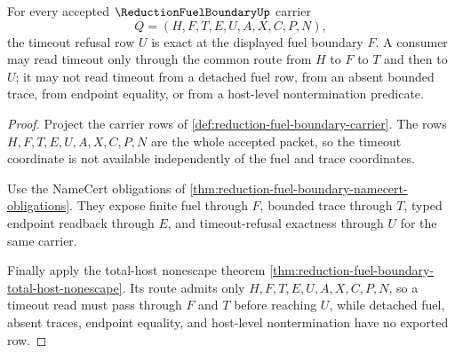 \begin{theorem}
\label{thm:reduction-fuel-boundary-fuel-timeout-exactness}
For every accepted $\ReductionFuelBoundaryUp$ carrier
$$
Q=(H,F,T,E,U,A,X,C,P,N),
$$
the timeout refusal row $U$ is exact at the displayed fuel boundary $F$. A consumer may read timeout only through the common route from $H$ to $F$ to $T$ and then to $U$; it may not read timeout from a detached fuel row, from an absent bounded trace, from endpoint equality, or from a host-level nontermination predicate.
\end{theorem}
\begin{proof}
Project the carrier rows of \autoref{def:reduction-fuel-boundary-carrier}. The rows $H,F,T,E,U,A,X,C,P,N$ are the whole accepted packet, so the timeout coordinate is not available independently of the fuel and trace coordinates.

Use the NameCert obligations of \autoref{thm:reduction-fuel-boundary-namecert-obligations}. They expose finite fuel through $F$, bounded trace through $T$, typed endpoint readback through $E$, and timeout-refusal exactness through $U$ for the same carrier.

Finally apply the total-host nonescape theorem \autoref{thm:reduction-fuel-boundary-total-host-nonescape}. Its route admits only $H,F,T,E,U,A,X,C,P,N$, so a timeout read must pass through $F$ and $T$ before reaching $U$, while detached fuel, absent traces, endpoint equality, and host-level nontermination have no exported row.
\end{proof}

